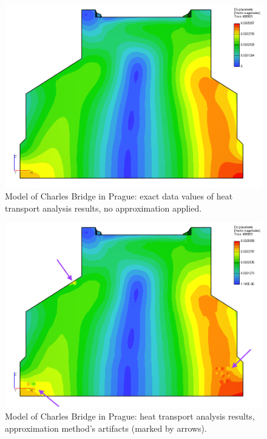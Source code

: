 \begin{figure}[H]
  \centering
  \includegraphics[width=\textwidth]{figures/chapter-results/charles-bridge-exact-data-values}
  \decoRule
  \caption[Model of Charles Bridge -- exact data values]{Model of Charles Bridge in Prague: exact data values of heat transport analysis results, no approximation applied.}
  \label{fig:charles-bridge-exact-data-values}
\end{figure}

\begin{figure}[H]
  \centering
  \includegraphics[width=\textwidth]{figures/chapter-results/charles-bridge-approximation-method-artifacts}
  \decoRule
  \caption[Model of Charles Bridge -- approximation method's artifacts]{Model of Charles Bridge in Prague: heat transport analysis results, approximation method's artifacts (marked by arrows).}
  \label{fig:charles-bridge-approximation-method-artifacts}
\end{figure}

